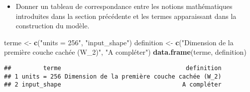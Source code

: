 \documentclass[]{article}
\newenvironment{Shaded}{\begin{snugshade}}{\end{snugshade}}
\newcommand{\KeywordTok}[1]{\textcolor[rgb]{0.13,0.29,0.53}{\textbf{#1}}}
\newcommand{\DataTypeTok}[1]{\textcolor[rgb]{0.13,0.29,0.53}{#1}}
\newcommand{\DecValTok}[1]{\textcolor[rgb]{0.00,0.00,0.81}{#1}}
\newcommand{\FloatTok}[1]{\textcolor[rgb]{0.00,0.00,0.81}{#1}}
\newcommand{\StringTok}[1]{\textcolor[rgb]{0.31,0.60,0.02}{#1}}
\newcommand{\CommentTok}[1]{\textcolor[rgb]{0.56,0.35,0.01}{\textit{#1}}}
\newcommand{\OperatorTok}[1]{\textcolor[rgb]{0.81,0.36,0.00}{\textbf{#1}}}
\newcommand{\NormalTok}[1]{#1}
\providecommand{\tightlist}{%
  \setlength{\itemsep}{0pt}\setlength{\parskip}{0pt}}
\begin{document}
\begin{Shaded}
\end{Shaded}

\begin{itemize}
\tightlist
\item
  Donner un tableau de correspondance entre les notions mathématiques
  introduites dans la section précédente et les termes apparaissant dans
  la construction du modèle.
\end{itemize}

\begin{Shaded}
\begin{Highlighting}[]
\NormalTok{terme <-}\StringTok{ }\KeywordTok{c}\NormalTok{(}\StringTok{"units = 256"}\NormalTok{, }\StringTok{"input_shape"}\NormalTok{)}
\NormalTok{definition <-}\StringTok{ }\KeywordTok{c}\NormalTok{(}\StringTok{"Dimension de la première couche cachée (W_2)"}\NormalTok{, }\StringTok{"A compléter"}\NormalTok{)}
\KeywordTok{data.frame}\NormalTok{(terme, definition)}
\end{Highlighting}
\end{Shaded}

\begin{verbatim}
##         terme                                   definition
## 1 units = 256 Dimension de la première couche cachée (W_2)
## 2 input_shape                                  A compléter
\end{verbatim}
\end{document}
